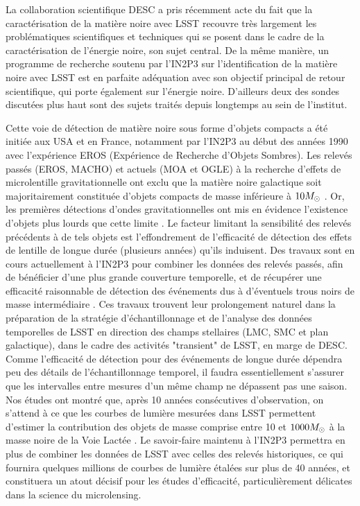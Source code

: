 \documentclass[12pt]{article}
\begin{document}
La collaboration scientifique DESC a pris récemment acte du fait que la caractérisation de la matière noire avec LSST recouvre très largement les problématiques scientifiques et techniques qui se posent dans le cadre de la caractérisation de l'énergie noire, son sujet central.
De la même manière, un programme de recherche soutenu par l'IN2P3 sur l'identification de la matière noire avec LSST est en parfaite adéquation avec son objectif principal de retour scientifique, qui porte également sur l'énergie noire. D'ailleurs deux des sondes discutées plus haut sont des sujets traités depuis longtemps au sein de l'institut.

Cette voie de détection de matière noire sous forme d'objets compacts a été initiée aux USA et en France, notamment par l'IN2P3 au début des
années 1990 avec l'expérience EROS (Expérience de Recherche d'Objets Sombres).
Les relevés passés (EROS, MACHO) et actuels (MOA et OGLE) à la recherche d'effets de microlentille gravitationnelle ont exclu que la matière noire galactique soit majoritairement constituée d'objets compacts de masse inférieure à $10M_\odot$ \citep{Tisserand2007,OGLE2010}. Or, les premières détections d'ondes gravitationnelles ont mis en évidence l'existence d'objets plus lourds que cette limite \citep{GW1,Bird}.
Le facteur limitant la sensibilité des relevés précédents à de tels objets est l'effondrement de
l'efficacité de détection des effets de lentille de longue durée (plusieurs années) qu'ils induisent.
Des travaux sont en cours actuellement à l'IN2P3 pour combiner les données des relevés passés, afin de bénéficier d'une plus grande couverture temporelle, et
de récupérer une efficacité raisonnable de détection des événements dus à d'éventuels trous noirs de masse intermédiaire \citep{MEMO}.
Ces travaux trouvent leur prolongement naturel dans la préparation de la stratégie d'échantillonnage et de
l'analyse des données temporelles de LSST en direction des champs stellaires (LMC, SMC et plan galactique), dans le cadre
des activités "transient" de LSST, en marge de DESC.
Comme l'efficacité de détection pour des événements de longue durée dépendra peu des détails de l'échantillonnage temporel, il faudra essentiellement
s'assurer que les intervalles entre mesures d'un même champ ne dépassent pas une saison. Nos études ont montré que,
après 10 années consécutives d'observation, on s'attend à ce que
les courbes de lumière mesurées dans LSST permettent d'estimer la contribution des objets de masse comprise entre
10 et $1000M_\odot$ à la masse noire de la Voie Lactée \citep{MEMO}. Le savoir-faire maintenu à l'IN2P3 permettra en plus
de combiner les données de LSST avec celles des relevés historiques, ce qui fournira quelques millions de courbes de lumière
étalées sur plus de 40 années, et constituera un atout décisif pour les études d'efficacité, particulièrement délicates dans
la science du microlensing.
\end{document}
